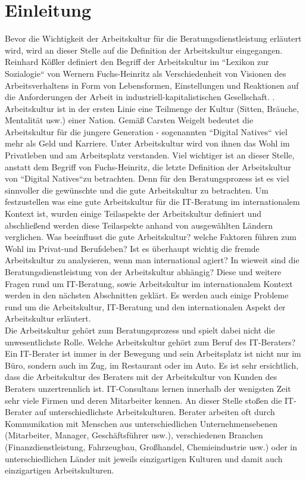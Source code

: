 	\section{Einleitung}
Bevor die Wichtigkeit der Arbeitskultur für die Beratungsdienstleistung erläutert wird, wird an dieser Stelle auf die Definition der Arbeitskultur eingegangen. Reinhard Kößler definiert den Begriff der Arbeitskultur im ``Lexikon zur Sozialogie`` von Wernern Fuchs-Heinritz als Verschiedenheit von Visionen des Arbeitsverhaltens in Form von Lebensformen, Einstellungen und Reaktionen auf die Anforderungen der Arbeit in industriell-kapitalistischen Gesellschaft. \cite{Fuchs-HeinritzLautmannRammstedtWienold1994}.
Arbeitskultur ist in der ersten Linie eine Teilmenge der Kultur (Sitten, Bräuche, Mentalität usw.) einer Nation. Gemäß Carsten Weigelt bedeutet die Arbeitskultur für die jungere Generation - sogenannten ``Digital Natives`` viel mehr als Geld und Karriere. Unter Arbeitskultur wird von ihnen das Wohl im Privatleben und am Arbeitsplatz verstanden.
Viel wichtiger ist an dieser Stelle, anstatt dem Begriff von Fuchs-Heinritz, die letzte Definition der Arbeitskultur von ``Digital Natives``zu betrachten. Denn für den Beratungsprozess ist es viel sinnvoller die gewünschte und die gute Arbeitskultur zu betrachten. Um festzustellen was eine gute Arbeitskultur für die IT-Beratung im internationalem Kontext ist, wurden einige Teilaspekte der Arbeitskultur definiert und abschließend werden diese Teilaspekte anhand von ausgewählten Ländern verglichen. Was beeinflusst die gute Arbeitskultur? welche Faktoren führen zum Wohl im Privat-und Berufsleben? Ist es überhaupt wichtig die fremde Arbeitskultur zu analysieren, wenn man international agiert? In wieweit sind die Beratungsdienstleistung von der Arbeitskultur abhängig? Diese und weitere Fragen rund um IT-Beratung, sowie Arbeitskultur im internationalem Kontext werden in den nächsten Abschnitten geklärt. Es werden auch einige Probleme rund um die Arbeitskultur, IT-Beratung und den internationalen Aspekt der Arbeitskultur erläutert.\\
Die Arbeitskultur gehört zum Beratungsprozess und spielt dabei nicht die unwesentlichste Rolle. Welche Arbeitskultur gehört zum Beruf des IT-Beraters? Ein IT-Berater ist immer in der Bewegung und sein Arbeitsplatz ist nicht nur im Büro, sondern auch im Zug, im Restaurant oder im Auto. Es ist sehr ersichtlich, dass die Arbeitskultur des Beraters mit der Arbeitskultur von Kunden des Beraters unzertrennlich ist. IT-Consultans lernen innerhalb der wenigsten Zeit sehr viele Firmen und deren Mitarbeiter kennen. An dieser Stelle stoßen die IT-Berater auf unterschiedlichste Arbeitskulturen. Berater arbeiten oft durch Kommunikation mit Menschen aus unterschiedlichen Unternehmensebenen (Mitarbeiter, Manager, Geschäftsführer usw.), verschiedenen Branchen (Finanzdienstleistung, Fahrzeugbau, Großhandel, Chemieindustrie usw.) oder in unterschiedlichen Länder mit jeweils einzigartigen Kulturen und damit auch einzigartigen Arbeitskulturen.\\
